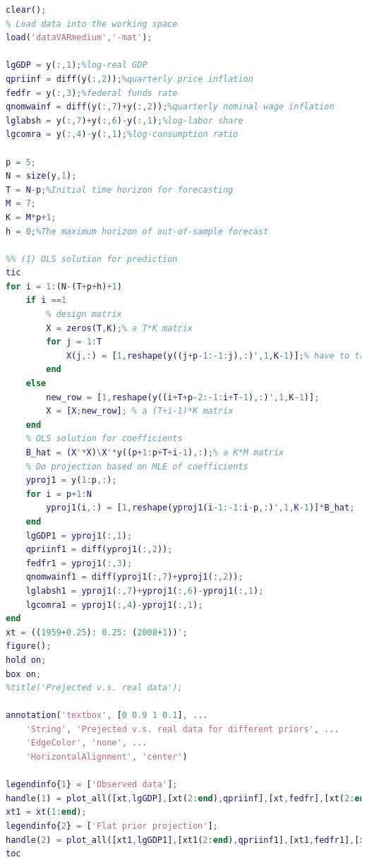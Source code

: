 \documentclass[11pt, oneside]{article}   	%
\begin{document}
\begin{lstlisting}[language=Matlab ,caption={Matlab code for problem 2.}, label={code:prob2}]
clear();
% Load data into the working space
load('dataVARmedium','-mat');

lgGDP = y(:,1);%log-real GDP
qpriinf = diff(y(:,2));%quarterly price inflation
fedfr = y(:,3);%federal funds rate
qnomwainf = diff(y(:,7)+y(:,2));%quarterly nominal wage inflation
lglabsh = y(:,7)+y(:,6)-y(:,1);%log-labor share
lgcomra = y(:,4)-y(:,1);%log-consumption ratio

p = 5;
N = size(y,1);
T = N-p;%Initial time horizon for forecasting
M = 7;
K = M*p+1;
h = 0;%The maximum horizon of out-of-sample forecast

%% (1) OLS solution for prediction
tic
for i = 1:(N-(T+p+h)+1)
    if i ==1
        % design matrix
        X = zeros(T,K);% a T*K matrix
        for j = 1:T
            X(j,:) = [1,reshape(y((j+p-1:-1:j),:)',1,K-1)];% have to transpose because the reshape function operate in column
        end
    else
        new_row = [1,reshape(y((i+T+p-2:-1:i+T-1),:)',1,K-1)];
        X = [X;new_row]; % a (T+i-1)*K matrix
    end
    % OLS solution for coefficients
    B_hat = (X'*X)\X'*y((p+1:p+T+i-1),:);% a K*M matrix
    % Do projection based on MLE of coefficients
    yproj1 = y(1:p,:);
    for i = p+1:N
        yproj1(i,:) = [1,reshape(yproj1(i-1:-1:i-p,:)',1,K-1)]*B_hat; 
    end
    lgGDP1 = yproj1(:,1);
    qpriinf1 = diff(yproj1(:,2));
    fedfr1 = yproj1(:,3);
    qnomwainf1 = diff(yproj1(:,7)+yproj1(:,2));
    lglabsh1 = yproj1(:,7)+yproj1(:,6)-yproj1(:,1);
    lgcomra1 = yproj1(:,4)-yproj1(:,1);
end
xt = ((1959+0.25): 0.25: (2008+1))';
figure();
hold on;
box on;
%title('Prejected v.s. real data');

annotation('textbox', [0 0.9 1 0.1], ...
    'String', 'Prejected v.s. real data for different priors', ...
    'EdgeColor', 'none', ...
    'HorizontalAlignment', 'center')

legendinfo{1} = ['Observed data'];
handle(1) = plot_all([xt,lgGDP],[xt(2:end),qpriinf],[xt,fedfr],[xt(2:end),qnomwainf],[xt,lglabsh],[xt,lgcomra],'-b','Observed data');
xt1 = xt(1:end);
legendinfo{2} = ['Flat prior projection'];
handle(2) = plot_all([xt1,lgGDP1],[xt1(2:end),qpriinf1],[xt1,fedfr1],[xt1(2:end),qnomwainf1],[xt1,lglabsh1],[xt1,lgcomra1],'-.r','Flat prior projection');
toc


\end{lstlisting}
\end{document}
